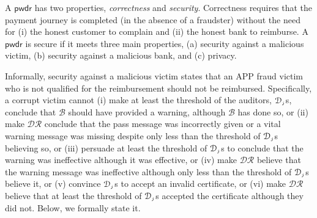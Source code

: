 

\vspace{-1.4mm}

A $\mathsf{pwdr}$  has two  properties,  \emph{correctness} and \emph{security}. Correctness requires that the payment journey is completed (in the absence of a fraudster) without the need for (i) the honest customer to complain and (ii)  the honest bank to reimburse.  A $\mathsf{pwdr}$  is secure if it meets three main properties,  (a) security against a malicious victim, (b) security against a malicious bank, and (c) privacy. 
%

Informally, security against a malicious victim states that an APP fraud victim who is not qualified for the reimbursement should not be reimbursed. 
%
Specifically, a corrupt victim cannot (i) make at least the threshold of the  auditors, $\mathcal{D}_{\scriptscriptstyle j}$s,  conclude that $\mathcal{B}$ should have provided a warning, although $\mathcal{B}$ has done so, or (ii) make $\mathcal{DR}$ conclude that   the pass message was incorrectly given or a vital warning message was missing despite only less than the threshold of  $\mathcal{D}_{\scriptscriptstyle j}$s  believing so, or (iii) persuade at least the threshold of $\mathcal{D}_{\scriptscriptstyle j}$s to  conclude that the warning was ineffective although it was effective, or (iv)  make $\mathcal{DR}$ believe that the warning message was ineffective although only less than the threshold of $\mathcal{D}_{\scriptscriptstyle j}$s believe it, or (v)  convince  $\mathcal{D}_{\scriptscriptstyle j}$s to accept an invalid certificate, or  (vi) make $\mathcal{DR}$ believe that at least the threshold of $\mathcal{D}_{\scriptscriptstyle j}$s accepted the certificate  although they did not. Below, we formally state it. 
%
\vspace{-1.6mm}

\vs 


